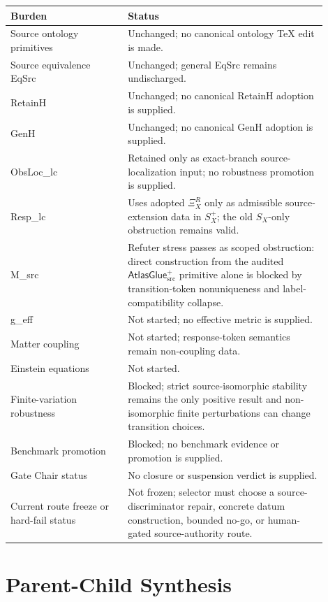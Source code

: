 \documentclass[11pt]{article}
\newcommand{\XiR}{\Xi_X^R}
\newcommand{\SX}{S_X}
\newcommand{\Splus}{S_X^+}
\newcommand{\AtlasGlue}{\mathsf{AtlasGlue}_{\mathrm{src}}^{+}}
\begin{document}
\begin{center}
\begin{tabular}{p{0.33\linewidth}p{0.57\linewidth}}
\hline
Burden & Status \\
\hline
Source ontology primitives & Unchanged; no canonical ontology TeX edit is made. \\
Source equivalence EqSrc & Unchanged; general EqSrc remains undischarged. \\
RetainH & Unchanged; no canonical RetainH adoption is supplied. \\
GenH & Unchanged; no canonical GenH adoption is supplied. \\
ObsLoc\_lc & Retained only as exact-branch source-localization input; no robustness promotion is supplied. \\
Resp\_lc & Uses adopted \(\XiR\) only as admissible source-extension data in \(\Splus\); the old \(\SX\)-only obstruction remains valid. \\
M\_src & Refuter stress passes as scoped obstruction: direct construction from the audited \(\AtlasGlue\) primitive alone is blocked by transition-token nonuniqueness and label-compatibility collapse. \\
g\_eff & Not started; no effective metric is supplied. \\
Matter coupling & Not started; response-token semantics remain non-coupling data. \\
Einstein equations & Not started. \\
Finite-variation robustness & Blocked; strict source-isomorphic stability remains the only positive result and non-isomorphic finite perturbations can change transition choices. \\
Benchmark promotion & Blocked; no benchmark evidence or promotion is supplied. \\
Gate Chair status & No closure or suspension verdict is supplied. \\
Current route freeze or hard-fail status & Not frozen; selector must choose a source-discriminator repair, concrete datum construction, bounded no-go, or human-gated source-authority route. \\
\hline
\end{tabular}
\end{center}

\section{Parent-Child Synthesis}
\end{document}
